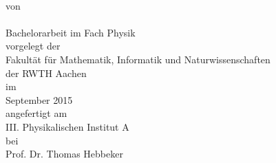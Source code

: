 
\makeatletter
\begin{titlepage}
		\tgherosfont
		\centering
		
		\Large
		
		\vspace*{\fill}
		
		{\Huge \color{ctcolormain}\textbf{\@title}} \\[8mm]
		
		\textsf{von} \\
		{\LARGE \@author} \\[48mm]
		
		Bachelorarbeit im Fach Physik \\[16mm]
		
		\textsf{vorgelegt der} \\
		Fakultät für Mathematik, Informatik und Naturwissenschaften \\der RWTH Aachen \\[8mm]
		
		\textsf{im} \\
		September 2015 \\[8mm]
		
		\textsf{angefertigt am} \\
		III. Physikalischen Institut A \\[8mm]
		
		\textsf{bei} \\
		Prof. Dr. Thomas Hebbeker \\
\end{titlepage}
\makeatother